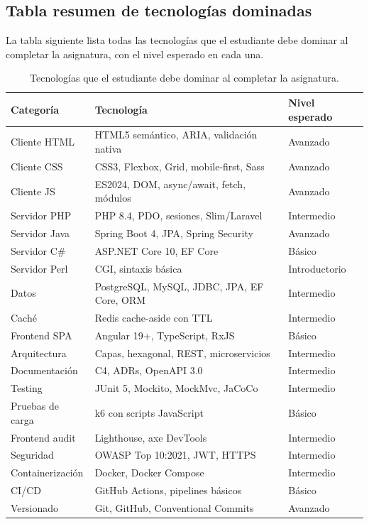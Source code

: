 \subsection{Tabla resumen de tecnologías dominadas}

La tabla siguiente lista todas las tecnologías que el
estudiante debe dominar al completar la asignatura, con el nivel
esperado en cada una.


\begin{table}[htbp]
\centering
\caption{Tecnologías que el estudiante debe dominar al completar la asignatura.}
\footnotesize
\begin{tabularx}{\textwidth}{lXl}
\toprule
\textbf{Categoría} & \textbf{Tecnología} & \textbf{Nivel esperado}\\
\midrule
Cliente HTML & HTML5 semántico, ARIA, validación nativa & Avanzado\\
Cliente CSS & CSS3, Flexbox, Grid, mobile-first, Sass & Avanzado\\
Cliente JS & ES2024, DOM, async/await, fetch, módulos & Avanzado\\
Servidor PHP & PHP 8.4, PDO, sesiones, Slim/Laravel & Intermedio\\
Servidor Java & Spring Boot 4, JPA, Spring Security & Avanzado\\
Servidor C\# & ASP.NET Core 10, EF Core & Básico\\
Servidor Perl & CGI, sintaxis básica & Introductorio\\
Datos & PostgreSQL, MySQL, JDBC, JPA, EF Core, ORM & Intermedio\\
Caché & Redis cache-aside con TTL & Intermedio\\
Frontend SPA & Angular 19+, TypeScript, RxJS & Básico\\
Arquitectura & Capas, hexagonal, REST, microservicios & Intermedio\\
Documentación & C4, ADRs, OpenAPI 3.0 & Intermedio\\
Testing & JUnit 5, Mockito, MockMvc, JaCoCo & Intermedio\\
Pruebas de carga & k6 con scripts JavaScript & Básico\\
Frontend audit & Lighthouse, axe DevTools & Intermedio\\
Seguridad & OWASP Top 10:2021, JWT, HTTPS & Intermedio\\
Containerización & Docker, Docker Compose & Intermedio\\
CI/CD & GitHub Actions, pipelines básicos & Básico\\
Versionado & Git, GitHub, Conventional Commits & Avanzado\\
\bottomrule
\end{tabularx}
\end{table}

